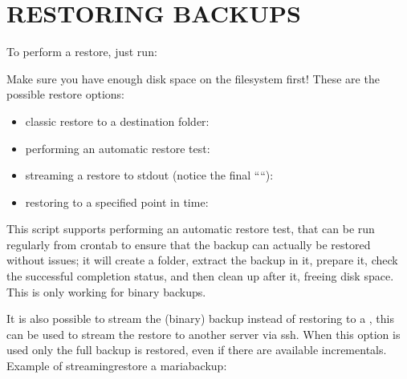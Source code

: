 \documentclass[letterpaper,10pt,english]{sphinxmanual}
\begin{document}
\sphinxAtStartPar
{}


\section{RESTORING BACKUPS}
\label{\detokenize{mariadb-backup-manager:restoring-backups}}
\sphinxAtStartPar
To perform a restore, just run:

\sphinxAtStartPar
{}

\sphinxAtStartPar
Make sure you have enough disk space on the  filesystem first!
These are the possible restore options:
\begin{itemize}
\item {} 
\sphinxAtStartPar
classic restore to a destination folder:

\item {} 
\sphinxAtStartPar
performing an automatic restore test:

\item {} 
\sphinxAtStartPar
streaming a restore to stdout (notice the final “\sphinxhyphen{}“):

\item {} 
\sphinxAtStartPar
restoring to a specified point in time:

\end{itemize}

\sphinxAtStartPar
This script supports performing an automatic restore test, that can be run regularly
from crontab to ensure that the backup can actually be restored without issues; it
will create a folder, extract the backup in it, prepare it, check the successful
completion status, and then clean up after it, freeing disk space. This is only
working for binary backups.

\sphinxAtStartPar
It is also possible to stream the (binary) backup instead of restoring to a
, this can be used to stream the restore to another server via ssh.
When this option is used only the full backup is restored, even if there are available
incrementals.  Example of streaming\sphinxhyphen{}restore a mariabackup:
\end{document}
